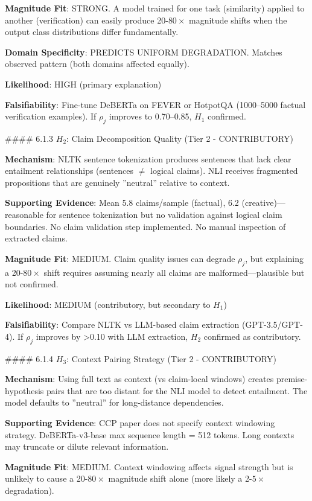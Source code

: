 \textbf{Magnitude Fit}: STRONG. A model trained for one task (similarity) applied to another (verification) can easily produce 20-$80\times$ magnitude shifts when the output class distributions differ fundamentally.

\textbf{Domain Specificity}: PREDICTS UNIFORM DEGRADATION. Matches observed pattern (both domains affected equally).

\textbf{Likelihood}: HIGH (primary explanation)

\textbf{Falsifiability}: Fine-tune DeBERTa on FEVER or HotpotQA (1000--5000 factual verification examples). If $\rho_j$ improves to 0.70--0.85, $H_1$ confirmed.

\#\#\#\# 6.1.3 $H_2$: Claim Decomposition Quality (Tier 2 - CONTRIBUTORY)

\textbf{Mechanism}: NLTK sentence tokenization produces sentences that lack clear entailment relationships (sentences $\neq$ logical claims). NLI receives fragmented propositions that are genuinely ''neutral'' relative to context.

\textbf{Supporting Evidence}: Mean 5.8 claims/sample (factual), 6.2 (creative)---reasonable for sentence tokenization but no validation against logical claim boundaries. No claim validation step implemented. No manual inspection of extracted claims.

\textbf{Magnitude Fit}: MEDIUM. Claim quality issues can degrade $\rho_j$, but explaining a 20-$80\times$ shift requires assuming nearly all claims are malformed---plausible but not confirmed.

\textbf{Likelihood}: MEDIUM (contributory, but secondary to $H_1$)

\textbf{Falsifiability}: Compare NLTK vs LLM-based claim extraction (GPT-3.5/GPT-4). If $\rho_j$ improves by >0.10 with LLM extraction, $H_2$ confirmed as contributory.

\#\#\#\# 6.1.4 $H_3$: Context Pairing Strategy (Tier 2 - CONTRIBUTORY)

\textbf{Mechanism}: Using full text as context (vs claim-local windows) creates premise-hypothesis pairs that are too distant for the NLI model to detect entailment. The model defaults to ''neutral'' for long-distance dependencies.

\textbf{Supporting Evidence}: CCP paper does not specify context windowing strategy. DeBERTa-v3-base max sequence length = 512 tokens. Long contexts may truncate or dilute relevant information.

\textbf{Magnitude Fit}: MEDIUM. Context windowing affects signal strength but is unlikely to cause a 20-$80\times$ magnitude shift alone (more likely a 2-$5\times$ degradation).

